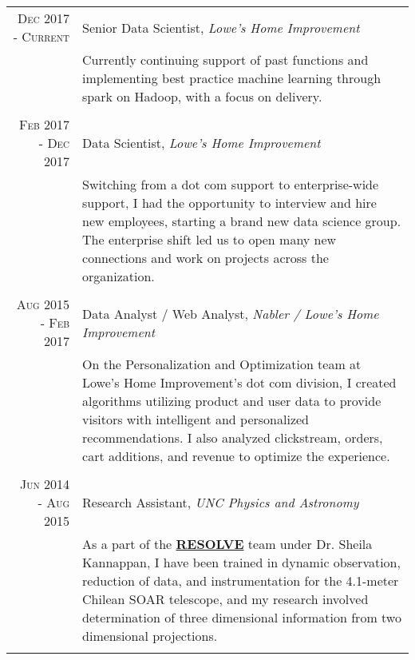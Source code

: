 \documentclass[a4paper,10pt]{article} %
\begin{document}
\begin{tabular}{r|p{11cm}}

\textsc{Dec 2017 - Current} & Senior Data Scientist, \emph{Lowe's Home Improvement} \\
& \footnotesize{Currently continuing support of past functions and implementing best practice machine learning through spark on Hadoop, with a focus on delivery.}\\

\multicolumn{2}{c}{} \\


\textsc{Feb 2017 - Dec 2017} & Data Scientist, \emph{Lowe's Home Improvement} \\
& \footnotesize{Switching from a dot com support to enterprise-wide support, I had the opportunity to interview and hire new employees, starting a brand new data science group. The enterprise shift led us to open many new connections and work on projects across the organization.}\\

\multicolumn{2}{c}{} \\


\textsc{Aug 2015 - Feb 2017} &  Data Analyst / Web Analyst, \emph{Nabler / Lowe's Home Improvement} \\
& \footnotesize{On the Personalization and Optimization team at Lowe's Home Improvement's dot com division, I created algorithms utilizing product and user data to provide visitors with intelligent and personalized recommendations. I also analyzed clickstream, orders, cart additions, and revenue to optimize the experience.}\\

\multicolumn{2}{c}{} \\


\textsc{Jun 2014 - Aug 2015} & Research Assistant, \emph{UNC Physics and Astronomy} \\ 
& \footnotesize{As a part of the \textbf{\href{http://resolve.astro.unc.edu/}{RESOLVE}} team under Dr. Sheila Kannappan, I have been trained in dynamic observation, reduction of data, and instrumentation for the 4.1-meter Chilean SOAR telescope, and my research involved determination of three dimensional information from two dimensional projections.}\\
\multicolumn{2}{c}{} \\


\end{tabular}
\end{document}
